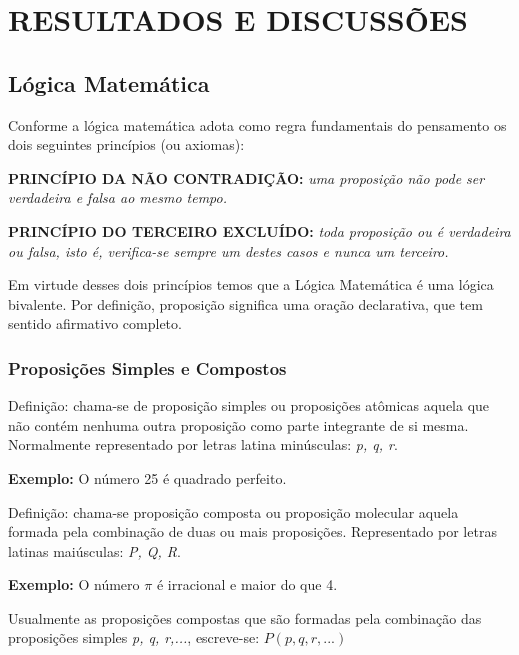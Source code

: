 \chapter{RESULTADOS E DISCUSSÕES}
\label{chap:resultados}

  \section{Lógica Matemática}

Conforme \cite{de2002iniciaccao} a lógica matemática adota como regra fundamentais do pensamento os dois seguintes princípios (ou axiomas):

\begin{axioma}
\textbf{PRINCÍPIO DA NÃO CONTRADIÇÃO:} \textit{uma proposição não pode ser verdadeira e falsa ao mesmo tempo.}
\end{axioma}

\begin{axioma}
\textbf{PRINCÍPIO DO TERCEIRO EXCLUÍDO:} \textit{toda proposição ou é verdadeira ou falsa, isto é, verifica-se sempre um destes casos e nunca um terceiro.}
\end{axioma}
  
Em virtude desses dois princípios temos que a Lógica Matemática é uma lógica bivalente. Por definição, proposição significa uma oração declarativa, que tem sentido afirmativo completo.  

    \subsection{Proposições Simples e Compostos}
    
Definição: chama-se de proposição simples ou proposições atômicas aquela que não contém nenhuma outra proposição como parte integrante de si mesma. Normalmente representado por letras latina minúsculas: \textit{p, q, r}.

\noindent\textbf{Exemplo:} O número 25 é quadrado perfeito.

Definição: chama-se proposição composta ou proposição molecular aquela formada pela combinação de duas ou mais proposições. Representado por letras latinas maiúsculas: \textit{P, Q, R}.

\noindent\textbf{Exemplo:} O número $\pi$ é irracional e maior do que 4.

Usualmente as proposições compostas que são formadas pela combinação das proposições simples \textit{p, q, r,...}, escreve-se: $P(p,q,r,...)$
    
